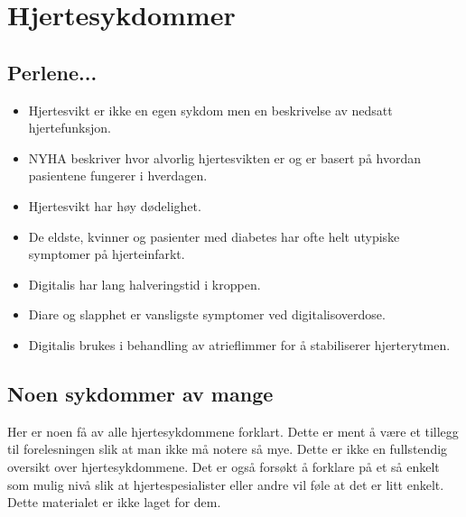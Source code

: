	\chapter{Hjertesykdommer}
		
		\section{Perlene...}
			\begin{itemize}
				\item Hjertesvikt er ikke en egen sykdom men en beskrivelse av nedsatt hjertefunksjon.\\
				\item NYHA beskriver hvor alvorlig hjertesvikten er og er basert på hvordan pasientene fungerer i hverdagen.\\
				\item Hjertesvikt har høy dødelighet.\\
				\item De eldste, kvinner og pasienter med diabetes har ofte helt utypiske symptomer på hjerteinfarkt.\\
				\item Digitalis har lang halveringstid i kroppen.\\
				\item Diare og slapphet er vansligste symptomer ved digitalisoverdose.\\
				\item Digitalis brukes i behandling av atrieflimmer for å stabiliserer hjerterytmen.\\
			\end{itemize}

		\section{Noen sykdommer av mange}	
			Her er noen få av alle hjertesykdommene forklart. Dette er ment å være et tillegg til forelesningen slik at man ikke må notere så mye. Dette er ikke en fullstendig oversikt over hjertesykdommene. Det er også forsøkt å forklare på et så enkelt som mulig nivå slik at hjertespesialister eller andre vil føle at det er litt enkelt. Dette materialet er ikke laget for dem.\\
